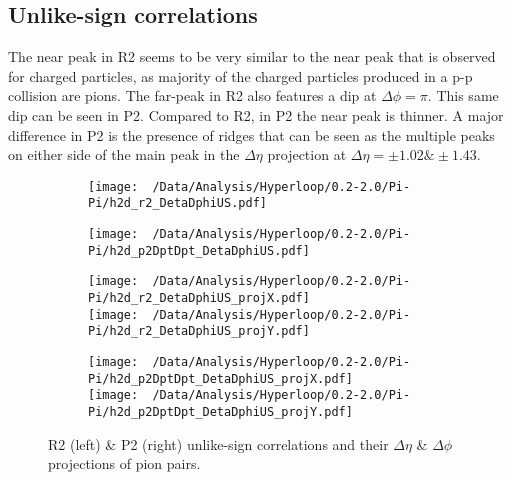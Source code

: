 \documentclass[12pt,a4paper,twoside]{report}
\begin{document}
\subsection{Unlike-sign correlations}
The near peak in R2 seems to be very similar to the near peak that is observed for charged particles, as majority of the charged particles produced in a p-p collision are pions. The far-peak in R2 also features a dip at $\Delta\phi=\pi$.
This same dip can be seen in P2. Compared to R2, in P2 the near peak is thinner. A major difference in P2 is the presence of ridges that can be seen as the multiple peaks on either side of the main peak in the $\Delta\eta$ projection at $\Delta\eta=\pm1.02\&\pm1.43$.
\begin{figure}[H]
	\begin{subfigure}{0.49\linewidth}
		\texttt{[image: ~/Data/Analysis/Hyperloop/0.2-2.0/Pi-Pi/h2d\_r2\_DetaDphiUS.pdf]}
	\end{subfigure}
	\begin{subfigure}{0.49\linewidth}
		\texttt{[image: ~/Data/Analysis/Hyperloop/0.2-2.0/Pi-Pi/h2d\_p2DptDpt\_DetaDphiUS.pdf]}
		\end{subfigure}
\end{figure}
\begin{figure}[H]
	\ContinuedFloat
	\begin{subfigure}{0.49\linewidth}
		\texttt{[image: ~/Data/Analysis/Hyperloop/0.2-2.0/Pi-Pi/h2d\_r2\_DetaDphiUS\_projX.pdf]}\\
		\texttt{[image: ~/Data/Analysis/Hyperloop/0.2-2.0/Pi-Pi/h2d\_r2\_DetaDphiUS\_projY.pdf]}\\
	\end{subfigure}
	\begin{subfigure}{0.49\linewidth}
		\texttt{[image: ~/Data/Analysis/Hyperloop/0.2-2.0/Pi-Pi/h2d\_p2DptDpt\_DetaDphiUS\_projX.pdf]}\\
		\texttt{[image: ~/Data/Analysis/Hyperloop/0.2-2.0/Pi-Pi/h2d\_p2DptDpt\_DetaDphiUS\_projY.pdf]}\\
	\end{subfigure}
	\caption{R2 (left) \& P2 (right) unlike-sign correlations and their $\Delta\eta$ \& $\Delta\phi$ projections of pion pairs.}
\end{figure}
\end{document}

